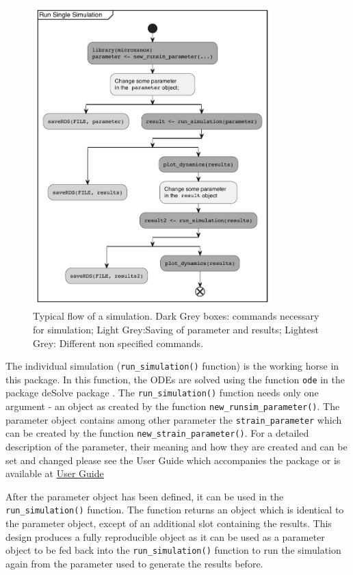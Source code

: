 \documentclass[]{elsarticle} %
\begin{document}
\begin{figure}

{\centering \includegraphics[width=350px]{./figures/simflow} 

}

\caption{Typical flow of a simulation. Dark Grey boxes: commands necessary for simulation; Light Grey:Saving of parameter and results; Lightest Grey: Different non specified commands.}\label{fig:runsim_example}
\end{figure}

The individual simulation (\texttt{run\_simulation()} function) is the
working horse in this package. In this function, the ODEs are solved
using the function \texttt{ode} in the package deSolve package
\citep{Soetaert2010}. The \texttt{run\_simulation()} function needs only
one argument - an object as created by the function
\texttt{new\_runsim\_parameter()}. The parameter object contains among
other parameter the \texttt{strain\_parameter} which can be created by
the function \texttt{new\_strain\_parameter()}. For a detailed
description of the parameter, their meaning and how they are created and
can be set and changed please see the User Guide which accompanies the
package or is available at \href{@LINK_NEEDED}{User Guide}

After the parameter object has been defined, it can be used in the
\texttt{run\_simulation()} function. The function returns an object
which is identical to the parameter object, except of an additional slot
containing the results. This design produces a fully reproducible object
as it can be used as a parameter object to be fed back into the
\texttt{run\_simulation()} function to run the simulation again from the
parameter used to generate the results before.
\end{document}
